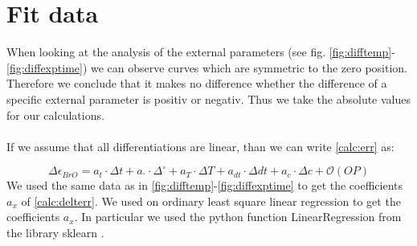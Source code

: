 \documentclass  [
  paper    = a4,
  BCOR     = 10mm,
  twoside,
  fontsize = 12pt,
  fleqn,
  toc      = bibnumbered,
  toc      = listofnumbered,
  numbers  = noendperiod,
  headings = normal,
  listof   = leveldown,
  version  = 3.03
]                                       {scrreprt}
\begin{document}
	
	\section{Fit data}
	When looking at the analysis of the external parameters (see fig. \ref{fig:difftemp}-\ref{fig:diffexptime}) we can observe curves which are symmetric to the zero position. Therefore we conclude that it makes no difference whether the difference of a specific external parameter is positiv or negativ. Thus we take the absolute values for our calculations.\\
	\\
	If we assume that all differentiations are linear, than we can write \cref{calc:err}
	as:  
	
	\begin{equation}
		\Delta \epsilon_{BrO} = a_{t}\cdot\Delta t+a_{^{\circ}}\cdot\Delta ^{\circ}+a_{T}\cdot\Delta T+a_{dt}\cdot\Delta dt +a_{c}\cdot\Delta c + \mathcal{O}\left(OP\right)
		\label{calc:delterr}
	\end{equation}
	We used the same data as in \cref{fig:difftemp}-\ref{fig:diffexptime} to get the coefficients $a_{x}$ of \cref{calc:delterr}. We used on ordinary least square linear regression to get the coefficients $a_{x}$. In particular we used the python function LinearRegression from the library sklearn \cite{SKlearn}.  

	
	

	
\end{document}
